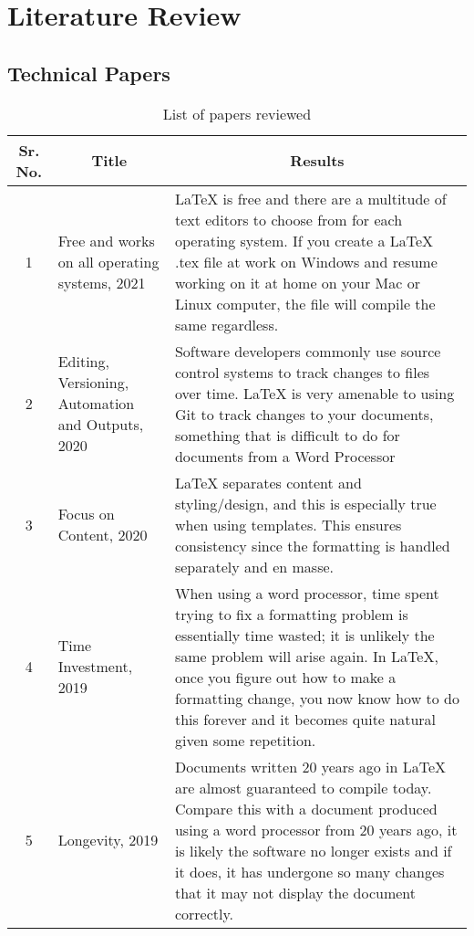 \chapter{Literature Review}

\section{Technical Papers}

{
\setlength{\tabcolsep}{10pt}
\renewcommand{\arraystretch}{1.5}
\newcommand{\centercolumn}[1]{\multicolumn{1}{|c|}{#1}}
\begin{table}[h!]
    \centering
    \begin{tabular}{|c|p{100pt}|p{250pt}|}
         \hline
    
        \centercolumn{Sr. No.} & \centercolumn{Title} & \centercolumn{Results} \\
        \hline
        
        1 & Free and works on all operating systems, 2021 & LaTeX is free and there are a multitude of text editors to choose from for each operating  system. If you create a LaTeX .tex file at work on Windows and resume working on it at home  on your Mac or Linux computer, the file will compile the same regardless.\\
        \hline
        
        2 & Editing, Versioning, Automation and Outputs, 2020 & Software developers commonly use source control systems to track changes to files over time.  LaTeX is very amenable to using Git to track changes to your documents, something that is  difficult to do for documents from a Word Processor \\
        \hline
        
        3 & Focus on Content, 2020 & LaTeX separates content and styling/design, and this is especially true when using templates.  This ensures consistency since the formatting is handled separately and en masse. \\
        \hline
        
        4 & Time Investment, 2019 & When using a word processor, time spent trying to fix a formatting problem is essentially time  wasted; it is unlikely the same problem will arise again. In LaTeX, once you figure out how to  make a formatting change, you now know how to do this forever and it becomes quite natural  given some repetition. \\
        \hline
        
        5 & Longevity, 2019 & Documents written 20 years ago in LaTeX are almost guaranteed to compile today. Compare  this with a document produced using a word processor from 20 years ago, it is likely the  software no longer exists and if it does, it has undergone so many changes that it may not  display the document correctly. \\
        \hline
    \end{tabular}
    \caption{List of papers reviewed}
    \label{tab:my_label}
\end{table}}

